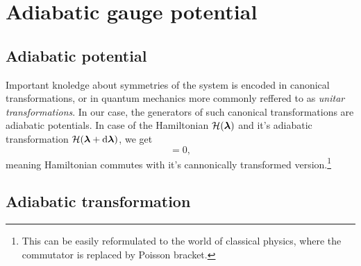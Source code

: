\section{Adiabatic gauge potential}




\subsection{Adiabatic potential}
Important knoledge about symmetries of the system is encoded in canonical transformations, or in quantum mechanics more commonly reffered to as \emph{unitar transformations}. In our case, the generators of such canonical transformations are adiabatic potentials. In case of the Hamiltonian $\mathcal{H}(\bm\lambda)$ and it's adiabatic transformation $\mathcal{H}(\bm\lambda+\mathrm{d} \bm\lambda)$, we get
\begin{equation}
    [\HH(\llambda),\HH(\llambda+\d \llambda)]=0,
\end{equation}
meaning Hamiltonian commutes with it's cannonically transformed version.\footnote{This can be easily reformulated to the world of classical physics, where the commutator is replaced by Poisson bracket.}


\subsection{Adiabatic transformation}



